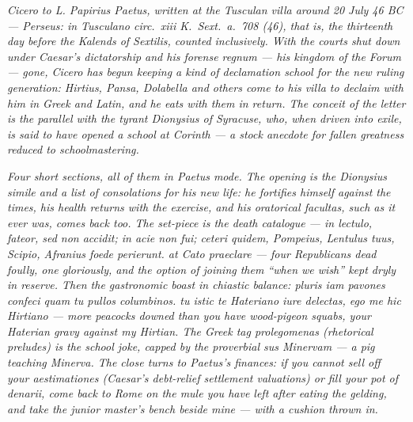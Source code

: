 
\textit{Cicero to L. Papirius Paetus, written at the Tusculan
villa around 20 July 46 BC --- Perseus: \textit{in Tusculano
circ.~xiii K.~Sext.~a.~708 (46)}, that is, the thirteenth day
before the Kalends of Sextilis, counted inclusively. With the
courts shut down under Caesar's dictatorship and his
\textit{forense regnum} --- his kingdom of the Forum --- gone,
Cicero has begun keeping a kind of declamation school for the
new ruling generation: Hirtius, Pansa, Dolabella and others come
to his villa to declaim with him in Greek and Latin, and he
eats with them in return. The conceit of the letter is the
parallel with the tyrant Dionysius of Syracuse, who, when
driven into exile, is said to have opened a school at Corinth ---
a stock anecdote for fallen greatness reduced to schoolmastering.}

\textit{Four short sections, all of them in Paetus mode. The
opening is the Dionysius simile and a list of consolations for
his new life: he fortifies himself against the times, his health
returns with the exercise, and his oratorical \textit{facultas},
such as it ever was, comes back too. The set-piece is the death
catalogue --- \textit{in lectulo, fateor, sed non accidit; in
acie non fui; ceteri quidem, Pompeius, Lentulus tuus, Scipio,
Afranius foede perierunt. at Cato praeclare} --- four
Republicans dead foully, one gloriously, and the option of
joining them ``when we wish'' kept dryly in reserve. Then the
gastronomic boast in chiastic balance: \textit{pluris iam pavones
confeci quam tu pullos columbinos. tu istic te Hateriano iure
delectas, ego me hic Hirtiano} --- more peacocks downed than you
have wood-pigeon squabs, your Haterian gravy against my
Hirtian. The Greek tag \textit{prolegomenas} (rhetorical
preludes) is the school joke, capped by the proverbial
\textit{sus Minervam} --- a pig teaching Minerva. The close
turns to Paetus's finances: if you cannot sell off your
\textit{aestimationes} (Caesar's debt-relief settlement
valuations) or fill your pot of denarii, come back to Rome on
the mule you have left after eating the gelding, and take the
junior master's bench beside mine --- with a cushion thrown in.}
